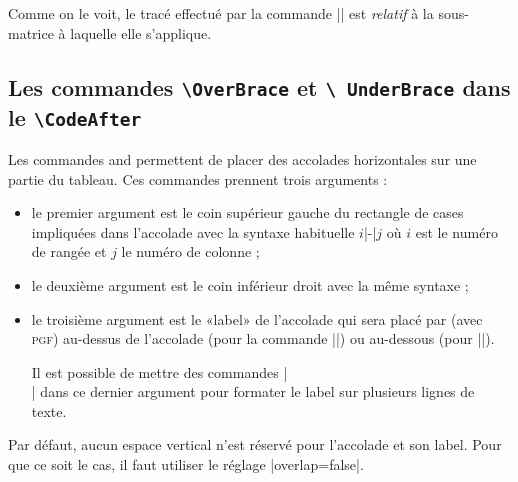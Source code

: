 \documentclass[dvipsnames]{article}
\begin{document}
\medskip
Comme on le voit, le tracé effectué par la commande |\MyDraw| est \emph{relatif}
à la sous-matrice à laquelle elle s'applique.



\subsection{Les commandes \texttt{\textbackslash OverBrace} et \texttt{\textbackslash
  UnderBrace} dans le \texttt{\textbackslash CodeAfter}}

\label{UnderBrace}
\label{OverBrace}



Les commandes  and 
permettent de placer des accolades horizontales sur une partie du tableau. Ces
commandes prennent trois arguments :
\begin{itemize}[beginpenalty=10000]
\item le premier argument est le coin supérieur gauche du rectangle de cases
impliquées dans l'accolade avec la syntaxe habituelle $i$|-|$j$ où $i$ est le
numéro de rangée et $j$ le numéro de colonne ;

\item le deuxième argument est le coin inférieur droit avec la même syntaxe ;

\item le troisième argument est le «label» de l'accolade qui sera placé par
 (avec \textsc{pgf}) au-dessus de l'accolade (pour la commande
|\OverBrace|) ou au-dessous (pour |\UnderBrace|).

Il est possible de mettre des commandes |\\| dans ce dernier argument pour
formater le label sur plusieurs lignes de texte.
\end{itemize}

\medskip
Par défaut, aucun espace vertical n'est réservé pour l'accolade et son label. Pour
que ce soit le cas, il faut utiliser le réglage |overlap=false|.
\end{document}
